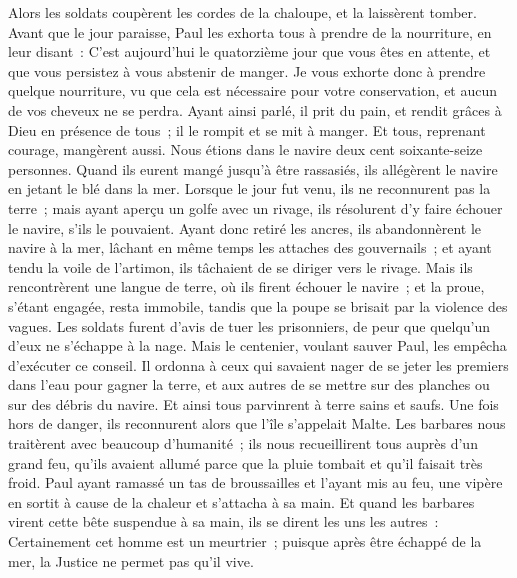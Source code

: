 \begin{multicols}{2}
Alors les soldats coupèrent les cordes de la chaloupe, et la laissèrent tomber.
Avant que le jour paraisse, Paul les exhorta tous à prendre de la nourriture, en leur disant~: C'est aujourd'hui le quatorzième jour que vous êtes en attente, et que vous persistez à vous abstenir de manger.
Je vous exhorte donc à prendre quelque nourriture, vu que cela est nécessaire pour votre conservation, et aucun de vos cheveux ne se perdra.
Ayant ainsi parlé, il prit du pain, et rendit grâces à Dieu en présence de tous~; il le rompit et se mit à manger.
Et tous, reprenant courage, mangèrent aussi.
Nous étions dans le navire deux cent soixante-seize personnes.
Quand ils eurent mangé jusqu'à être rassasiés, ils allégèrent le navire en jetant le blé dans la mer.
Lorsque le jour fut venu, ils ne reconnurent pas la terre~; mais ayant aperçu un golfe avec un rivage, ils résolurent d'y faire échouer le navire, s'ils le pouvaient.
Ayant donc retiré les ancres, ils abandonnèrent le navire à la mer, lâchant en même temps les attaches des gouvernails~; et ayant tendu la voile de l'artimon, ils tâchaient de se diriger vers le rivage.
Mais ils rencontrèrent une langue de terre, où ils firent échouer le navire~; et la proue, s'étant engagée, resta immobile, tandis que la poupe se brisait par la violence des vagues.
Les soldats furent d'avis de tuer les prisonniers, de peur que quelqu'un d'eux ne s'échappe à la nage.
Mais le centenier, voulant sauver Paul, les empêcha d'exécuter ce conseil. Il ordonna à ceux qui savaient nager de se jeter les premiers dans l'eau pour gagner la terre,
et aux autres de se mettre sur des planches ou sur des débris du navire. Et ainsi tous parvinrent à terre sains et saufs.
\VerseOne{}Une fois hors de danger, ils reconnurent alors que l'île s'appelait Malte.
Les barbares nous traitèrent avec beaucoup d'humanité~; ils nous recueillirent tous auprès d'un grand feu, qu'ils avaient allumé parce que la pluie tombait et qu'il faisait très froid.
Paul ayant ramassé un tas de broussailles et l'ayant mis au feu, une vipère en sortit à cause de la chaleur et s'attacha à sa main.
Et quand les barbares virent cette bête suspendue à sa main, ils se dirent les uns les autres~: Certainement cet homme est un meurtrier~; puisque après être échappé de la mer, la Justice ne permet pas qu'il vive.

\end{multicols}
